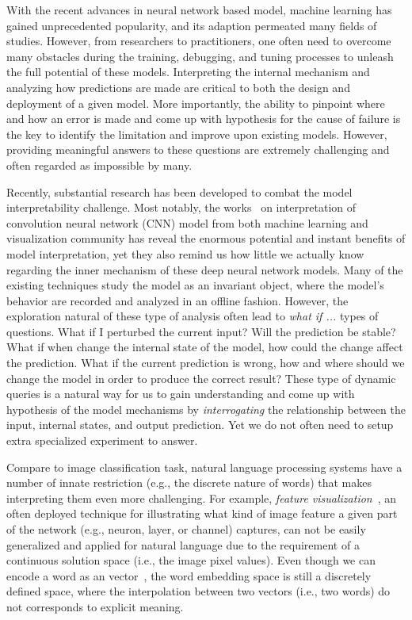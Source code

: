 \maketitle

With the recent advances in neural network based model, machine learning has
gained unprecedented popularity, and its adaption permeated many fields of studies.
%
However, from researchers to practitioners, one often need to overcome many
obstacles during the training, debugging, and tuning processes to unleash
the full potential of these models.
%
Interpreting the internal mechanism and analyzing how predictions are made are critical to both the design and deployment of a given model.
More importantly, the ability to pinpoint where and how an error is made and come up with hypothesis for the cause of failure is the key to identify the limitation and improve upon existing models.
However, providing meaningful answers to these questions are extremely challenging and often regarded as impossible by many.

Recently, substantial research has been developed to combat the model interpretability challenge. Most notably, the works~\cite{} on interpretation of convolution neural network (CNN) model from both machine learning and visualization community has reveal the enormous potential and instant benefits of model interpretation, yet they also remind us how little we actually know regarding the inner mechanism of these deep neural network models. 
%
Many of the existing techniques study the model as an invariant object, where the model's behavior are recorded and analyzed in an offline fashion.
%
However, the exploration natural of these type of analysis often lead to \emph{what if ...} types of questions. What if I perturbed the current input? Will the prediction be stable? What if when change the internal state of the model, how could the change affect the prediction. What if the current prediction is wrong, how and where should we change the model in order to produce the correct result? These type of dynamic queries is a natural way for us to gain understanding and come up with hypothesis of the model mechanisms by \emph{interrogating} the relationship between the input, internal states, and output prediction. Yet we do not often need to setup extra specialized experiment to answer.

Compare to image classification task, natural language processing systems have a number of innate restriction (e.g., the discrete nature of words) that makes interpreting them even more challenging. For example, \emph{feature visualization}~\cite{}, an often deployed technique for illustrating what kind of image feature a given part of the network (e.g., neuron, layer, or channel) captures, can not be easily generalized and applied for natural language due to the requirement of a continuous solution space (i.e., the image pixel values). Even though we can encode a word as an vector~\cite{}, the word embedding space is still a discretely defined space, where the interpolation between two vectors (i.e., two words) do not corresponds to explicit meaning.

